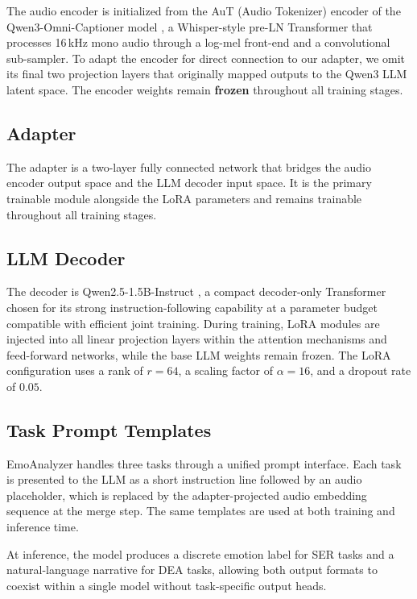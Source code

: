 The audio encoder is initialized from the AuT (Audio Tokenizer) encoder of the Qwen3-Omni-Captioner model \cite{qwen3omni-captioner}, a Whisper-style pre-LN Transformer that processes 16\,kHz mono audio through a log-mel front-end and a convolutional sub-sampler. To adapt the encoder for direct connection to our adapter, we omit its final two projection layers that originally mapped outputs to the Qwen3 LLM latent space. The encoder weights remain \textbf{frozen} throughout all training stages.



\subsection{Adapter}

The adapter is a two-layer fully connected network that bridges the audio encoder output space and the LLM decoder input space. It is the primary trainable module alongside the LoRA parameters and remains trainable throughout all training stages.



\subsection{LLM Decoder}

The decoder is Qwen2.5-1.5B-Instruct \cite{qwen2.5}, a compact decoder-only Transformer chosen for its strong instruction-following capability at a parameter budget compatible with efficient joint training. During training, LoRA modules are injected into all linear projection layers within the attention mechanisms and feed-forward networks, while the base LLM weights remain frozen. The LoRA configuration uses a rank of $r{=}64$, a scaling factor of $\alpha{=}16$, and a dropout rate of $0.05$.



\subsection{Task Prompt Templates}

EmoAnalyzer handles three tasks through a unified prompt interface. Each task is presented to the LLM as a short instruction line followed by an audio placeholder, which is replaced by the adapter-projected audio embedding sequence at the merge step. The same templates are used at both training and inference time.


At inference, the model produces a discrete emotion label for SER tasks and a natural-language narrative for DEA tasks, allowing both output formats to coexist within a single model without task-specific output heads.
